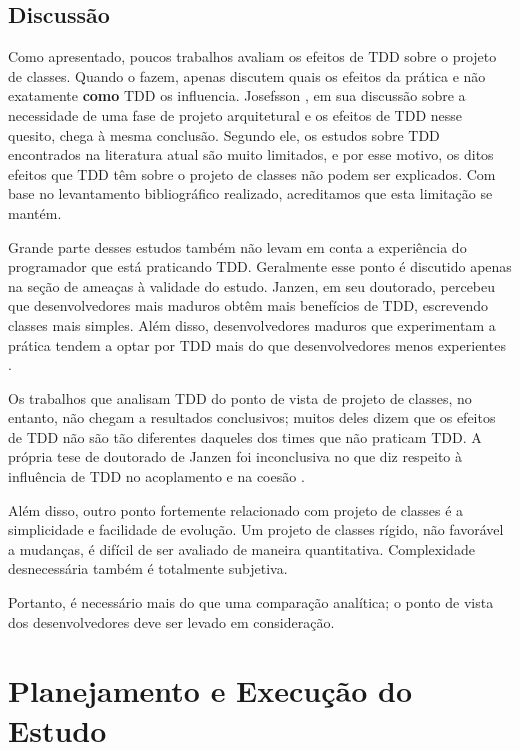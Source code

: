 \documentclass[conference]{IEEEtran}
\begin{document}
\subsection{Discussão}

Como apresentado, poucos trabalhos avaliam os efeitos de TDD sobre o
projeto de classes. Quando o fazem, apenas discutem quais os efeitos da prática
e não exatamente \textbf{como} TDD os influencia. Josefsson
\cite{josefsson}, em sua discussão sobre a necessidade de uma fase de projeto
arquitetural e os efeitos de TDD nesse quesito, chega à mesma conclusão. Segundo
ele, os estudos sobre TDD encontrados na literatura atual são muito limitados, e
por esse motivo, os ditos efeitos que TDD têm 
sobre o projeto de classes não podem ser explicados. Com base no levantamento
bibliográfico realizado, acreditamos que esta limitação se mantém.

Grande parte desses estudos também não levam em conta a experiência do
programador que está praticando TDD. Geralmente esse ponto é discutido apenas 
na seção de ameaças à validade do estudo. Janzen, em seu doutorado, percebeu que
desenvolvedores mais maduros obtêm mais benefícios de TDD, escrevendo classes
mais simples. Além disso, desenvolvedores maduros que experimentam a prática
tendem a optar por TDD mais do que desenvolvedores menos experientes
\cite{janzen-phd}.

Os trabalhos que analisam TDD do ponto de vista de projeto de classes, no entanto, não
chegam a resultados conclusivos; muitos deles dizem que os efeitos
de TDD não são tão diferentes daqueles dos times que não praticam TDD.  A própria tese de
doutorado de Janzen foi inconclusiva no que diz respeito à influência de TDD no 
acoplamento e na coesão \cite{janzen-phd}. 

Além disso, outro ponto fortemente relacionado com projeto de classes é a simplicidade e
facilidade de evolução. Um projeto de classes rígido, não favorável a mudanças,  é difícil de ser 
avaliado de maneira quantitativa. Complexidade
desnecessária também é totalmente subjetiva. 

Portanto, é necessário mais do que uma comparação analítica; o
ponto de vista dos desenvolvedores deve ser levado em consideração.

\section{Planejamento e Execução do Estudo} 
\label{sec:planejamento}
\end{document}
